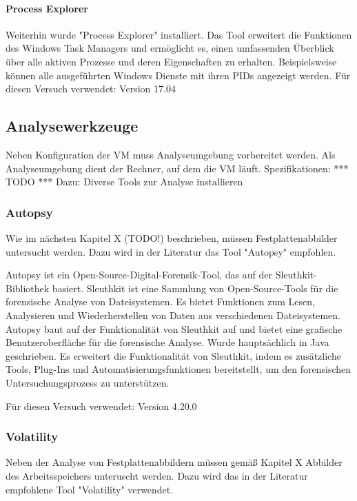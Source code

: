 \paragraph*{Process Explorer}
Weiterhin wurde "Process Explorer" installiert. Das Tool erweitert die Funktionen des Windows Task Managers und ermöglicht es, einen umfassenden Überblick über alle aktiven Prozesse und deren Eigenschaften zu erhalten. Beispielsweise können alle ausgeführten Windows Dienste mit ihren PIDs angezeigt werden.
Für diesen Versuch verwendet: Version 17.04

\subsection{Analysewerkzeuge}

Neben Konfiguration der VM muss Analyseumgebung vorbereitet werden.
Als Analyseumgebung dient der Rechner, auf dem die VM läuft.
Spezifikationen: *** TODO ***
Dazu: Diverse Tools zur Analyse installieren

\subsubsection*{Autopsy}
Wie im nächsten Kapitel X (TODO!) beschrieben, müssen Festplattenabbilder untersucht werden.
Dazu wird in der Literatur das Tool "Autopsy" empfohlen.

Autopsy ist ein Open-Source-Digital-Forensik-Tool, das auf der Sleuthkit-Bibliothek basiert. 
Sleuthkit ist eine Sammlung von Open-Source-Tools für die forensische Analyse von Dateisystemen. Es bietet Funktionen zum Lesen, Analysieren und Wiederherstellen von Daten aus verschiedenen Dateisystemen. 
Autopsy baut auf der Funktionalität von Sleuthkit auf und bietet eine grafische Benutzeroberfläche für die forensische Analyse. 
Wurde hauptsächlich in Java geschrieben.
Es erweitert die Funktionalität von Sleuthkit, indem es zusätzliche Tools, Plug-Ins und Automatisierungsfunktionen bereitstellt, um den forensischen Untersuchungsprozess zu unterstützen.
 
Für diesen Versuch verwendet: Version 4.20.0

\subsubsection*{Volatility}
Neben der Analyse von Festplattenabbildern müssen gemäß Kapitel X Abbilder des Arbeitsspeichers unteruscht werden. Dazu wird das in der Literatur empfohlene Tool "Volatility" verwendet.
 
